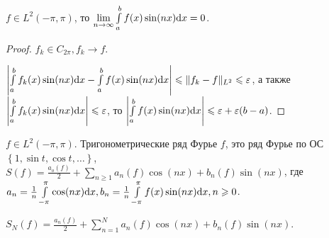 \begin{consequence}
    $f \in L^2(-\pi, \pi)$, то $\lim\limits_{n \to \infty} \int\limits_{a}^{b} f(x)\sin(nx) \mathrm{d}x = 0$.
\end{consequence}
\begin{proof}
    $f_k \in C_{2 \pi}, f_k \to f$.

    $\left| \int\limits_{a}^{b} f_k(x)\sin(nx)\mathrm{d}x - \int\limits_{a}^{b} f(x)\sin(nx) \mathrm{d}x    \right| \leqslant  \|f_k - f\|_{L^2} \leqslant  \varepsilon$, а также $\left| \int\limits_{a}^{b} f_k(x)\sin(nx)\mathrm{d}x \right| \leqslant  \varepsilon$, то $\left| \int\limits_{a}^{b} f(x) \sin (nx) \mathrm{d}x  \right| \leqslant  \varepsilon + \varepsilon(b-a)$.
\end{proof}
\begin{definition}
    $f \in L^2(-\pi, \pi)$. Тригонометрические ряд Фурье $f$, это ряд Фурье по ОС  $\left\{ 1, \sin t, \cos t,\ldots \right\}$, $S(f) = \frac{a_o(f)}{2} + \sum\limits_{n \ge  1} a_n(f) \cos(nx) + b_n(f)\sin(nx)$, где $a_n = \frac{1}{n} \int\limits_{-\pi}^{\pi} \cos(nx) \mathrm{d}x, b_n = \frac{1}{n} \int\limits_{-\pi}^{\pi} f(x)\sin(nx)\mathrm{d}x, n \geqslant 0$.

    $S_N(f) = \frac{a_n(f)}{2} + \sum\limits_{n = 1}^{N} a_n(f) \cos(nx) + b_n(f)\sin(nx)$.
\end{definition}

